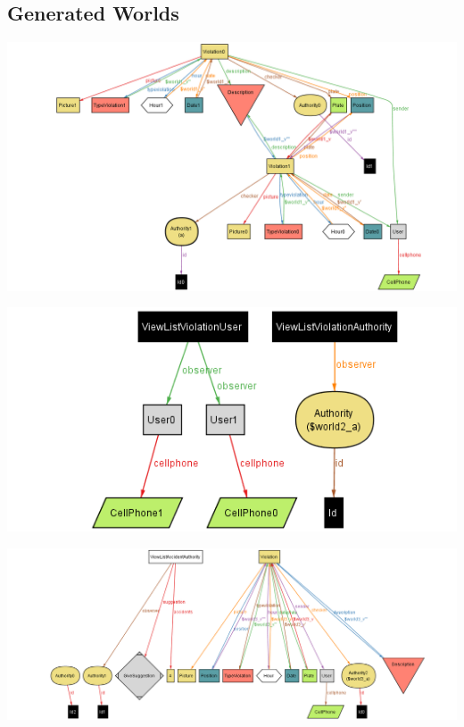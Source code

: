 
\vspace{1cm}
\subsection{Generated Worlds}

\vspace{1cm}
\includegraphics[width=\textwidth]{Images/AlloyWorlds/World1.png}
\newpage

\vspace{1cm}
\includegraphics[width=\textwidth]{Images/AlloyWorlds/World2.png}
\vspace{1cm}

\vspace{1cm}
\includegraphics[width=\textwidth]{Images/AlloyWorlds/World3.png}

